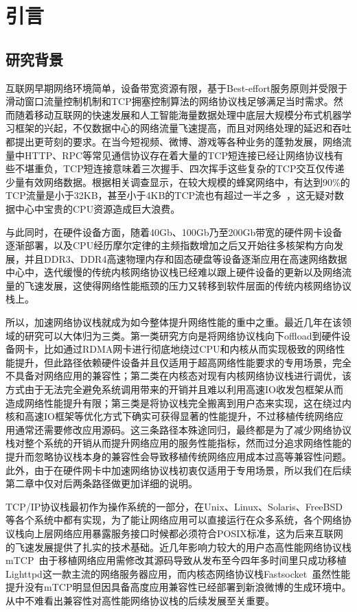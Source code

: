 \chapter{引言}
\label{cha:intro}

\section{研究背景}
\label{sec:01_general_intro}

互联网早期网络环境简单，设备带宽资源有限，基于Best-effort服务原则并受限于滑动窗口流量控制机制和TCP拥塞控制算法的网络协议栈足够满足当时需求。然而随着移动互联网的快速发展和人工智能海量数据处理中底层大规模分布式机器学习框架的兴起，不仅数据中心的网络流量飞速提高，而且对网络处理的延迟和吞吐都提出更苛刻的要求。在当今短视频、微博、游戏等各种业务的蓬勃发展，网络流量中HTTP、RPC等常见通信协议存在着大量的TCP短连接已经让网络协议栈有些不堪重负，TCP短连接意味着三次握手、四次挥手这些复杂的TCP交互仅传递少量有效网络数据。根据相关调查显示，在较大规模的蜂窝网络中，有达到90\%的TCP流量是小于32KB，甚至小于4KB的TCP流也有超过一半之多~\cite{woo2013comparison}，这无疑对数据中心中宝贵的CPU资源造成巨大浪费。

与此同时，在硬件设备方面，随着40Gb、100Gb乃至200Gb带宽的硬件网卡设备逐渐部署，以及CPU经历摩尔定律的主频指数增加之后又开始往多核架构方向发展，并且DDR3、DDR4高速物理内存和固态硬盘等设备逐渐应用在高速网络数据中心中，迭代缓慢的传统内核网络协议栈已经难以跟上硬件设备的更新以及网络流量的飞速发展，这使得网络性能瓶颈的压力又转移到软件层面的传统内核网络协议栈上。

所以，加速网络协议栈就成为如今整体提升网络性能的重中之重。最近几年在该领域的研究可以大体归为三类。第一类研究方向是将网络协议栈向下offload到硬件设备网卡，比如通过RDMA网卡进行彻底地绕过CPU和内核从而实现极致的网络性能提升，但此路径依赖硬件设备并且仅适用于超高网络性能要求的专用场景，完全不具备对网络应用的兼容性；第二类在内核态对现有内核网络协议栈进行调优，该方式由于无法完全避免系统调用带来的开销并且难以利用高速IO收发包框架从而造成网络性能提升有限；第三类是将协议栈完全搬离到用户态来实现，这在绕过内核和高速IO框架等优化方式下确实可获得显著的性能提升，不过移植传统网络应用通常还需要修改应用源码。这三条路径本殊途同归，最终都是为了减少网络协议栈对整个系统的开销从而提升网络应用的服务性能指标，然而过分追求网络性能的提升而忽略协议栈本身的兼容性会导致移植传统网络应用成本过高等兼容性问题。此外，由于在硬件网卡中加速网络协议栈初衷仅适用于专用场景，所以我们在后续第二章中仅对后两条路径做更加详细的说明。

TCP/IP协议栈最初作为操作系统的一部分，在Unix、Linux、Solaris、FreeBSD等各个系统中都有实现，为了能让网络应用可以直接运行在众多系统，各个网络协议栈向上层网络应用暴露服务接口时候都必须符合POSIX标准，这为后来互联网的飞速发展提供了扎实的技术基础。近几年影响力较大的用户态高性能网络协议栈mTCP~\cite{mTCP}由于移植网络应用需修改其源码导致从发布至今四年多时间里只成功移植Lighttpd这一款主流的网络服务器应用，而内核态网络协议栈Fastsocket~\cite{fastsocket}虽然性能提升没有mTCP明显但因具备高度应用兼容性已经部署到新浪微博的生成环境中。从中不难看出兼容性对高性能网络协议栈的后续发展至关重要。

